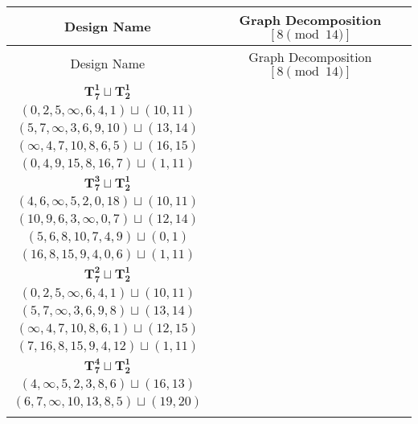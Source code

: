 \documentclass{article}
\begin{document}
    \begin{longtable}{|c|c|}
        \hline
        Design Name & Graph Decomposition $[8\pmod{14}]$ \\
        \hline
        \endfirsthead
        \hline
        Design Name & Graph Decomposition $[8\pmod{14}]$ \\
        \hline
        \endhead
        $\mathbf{T_{7}^{1}} \sqcup \mathbf{T_{2}^{1}}$ & \begin{tabular}{c}
        $(0,1,\infty,2,4,5,3)\sqcup(12,15)$ \\ 
        $(0,2,5,\infty,6,4,1)\sqcup(10,11)$ \\ 
        $(5,7,\infty,3,6,9,10)\sqcup(13,14)$ \\ 
        $(\infty,4,7,10,8,6,5)\sqcup(16,15)$ \\ 
        $(0,4,9,15,8,16,7)\sqcup(1,11)$
        \end{tabular} \\ 
        \hline
        $\mathbf{T_{7}^{3}} \sqcup \mathbf{T_{2}^{1}}$ & \begin{tabular}{c}
        $(3,5,4,2,\infty,8,1)\sqcup(12,15)$ \\ 
        $(4,6,\infty,5,2,0,18)\sqcup(10,11)$ \\ 
        $(10,9,6,3,\infty,0,7)\sqcup(12,14)$ \\ 
        $(5,6,8,10,7,4,9)\sqcup(0,1)$ \\ 
        $(16,8,15,9,4,0,6)\sqcup(1,11)$
        \end{tabular} \\ 
        \hline
        $\mathbf{T_{7}^{2}} \sqcup \mathbf{T_{2}^{1}}$ & \begin{tabular}{c}
        $(3,5,4,2,\infty,1,6)\sqcup(9,10)$ \\ 
        $(0,2,5,\infty,6,4,1)\sqcup(10,11)$ \\ 
        $(5,7,\infty,3,6,9,8)\sqcup(13,14)$ \\ 
        $(\infty,4,7,10,8,6,1)\sqcup(12,15)$ \\ 
        $(7,16,8,15,9,4,12)\sqcup(1,11)$
        \end{tabular} \\ 
        \hline
        $\mathbf{T_{7}^{4}} \sqcup \mathbf{T_{2}^{1}}$ & \begin{tabular}{c}
        $(1,2,4,5,8,0,\infty)\sqcup(11,13)$ \\ 
        $(4,\infty,5,2,3,8,6)\sqcup(16,13)$ \\ 
        $(6,7,\infty,10,13,8,5)\sqcup(19,20)$ \\ 

\end{tabular}
\end{longtable}
\end{document}
